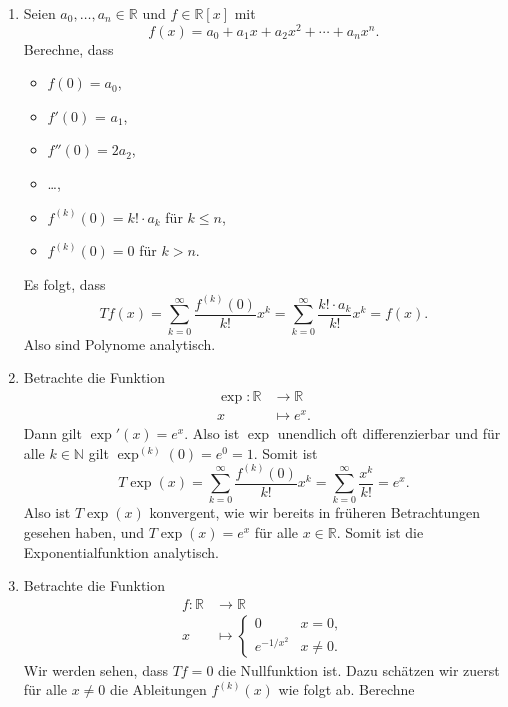 \documentclass[../main.tex]{subfiles}
\begin{document}
\begin{examples}
  \leavevmode
  \begin{enumerate}[(1)]
    \item Seien $a_0, \dots, a_n \in \mathbb{R}$ und
      $f \in \mathbb{R}[x]$ mit
      \[
        f(x) = a_0 + a_1 x + a_2 x^2 + \cdots +a_n x^{n}.
      \]
      Berechne, dass
      \begin{itemize}
        \item $f(0) = a_0$,
        \item $f'(0)$ = $a_1$,
        \item $f''(0) = 2a_2$,
        \item \dots,
        \item $f^{(k)}(0) = k! \cdot a_k$ für $k \leq n$,
        \item $f^{(k)}(0) = 0$ für $k > n$.
      \end{itemize}
      Es folgt, dass
      \[
        Tf(x) = \sum_{k=0}^{\infty} \frac{f^{(k)}(0)}{k!}x^k
        = \sum_{k=0}^{\infty} \frac{k! \cdot a_k}{k!}x^k = f(x).
      \]
      Also sind Polynome analytisch.
    \item Betrachte die Funktion
      \begin{align*}
        \exp \colon \mathbb{R} & \to \mathbb{R} \\
        x & \mapsto e^x.
      \end{align*}
      Dann gilt $\exp'(x) = e^x$. Also ist $\exp$ unendlich oft differenzierbar
      und für alle $k \in \mathbb{N}$ gilt $\exp^{(k)}(0) = e^0 = 1$.
      Somit ist
      \[
        T\exp(x) = \sum_{k=0}^{\infty} \frac{f^{(k)}(0)}{k!}x^k
        = \sum_{k=0}^{\infty} \frac{x^k}{k!} = e^x.
      \]
      Also ist $T\exp(x)$ konvergent, wie wir bereits in früheren Betrachtungen
      gesehen haben, und $T\exp(x) = e^x$ für alle $x \in \mathbb{R}$.
      Somit ist die Exponentialfunktion analytisch.
    \item Betrachte die Funktion
      \begin{align*}
        f \colon \mathbb{R} & \to \mathbb{R} \\
        x & \mapsto 
        \begin{cases}
          0 & x = 0,\\
          e^{-1/x^2} & x \neq 0.
        \end{cases}
      \end{align*}
      Wir werden sehen, dass $Tf = 0$ die Nullfunktion ist.
      Dazu schätzen wir zuerst für alle $x \neq 0$ die Ableitungen
      $f^{(k)}(x)$ wie folgt ab. Berechne

\end{enumerate}
\end{examples}
\end{document}
